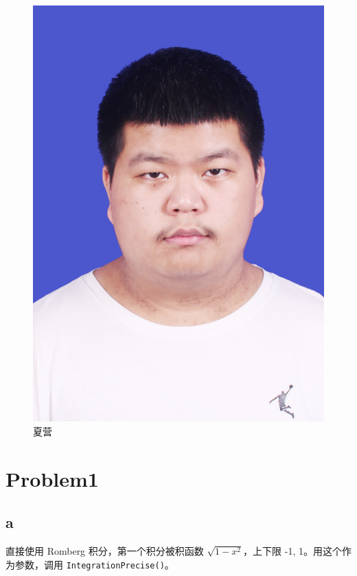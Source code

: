 \documentclass[UTF8]{ctexart}
\begin{document}
\begin{figure}[h]
        \begin{minipage}{0.32\textwidth}
            \centering
            \includegraphics[width=\linewidth]{xy}
            \caption{夏营}
            \label{fig:img3}
        \end{minipage}
    \end{figure}

    \section{Problem1}\label{sec:section1}
    \subsection{a}\label{subsec:1.1}
    直接使用 Romberg 积分，第一个积分被积函数 \(\sqrt{1 - x^2}\)，上下限 -1, 1。用这个作为参数，调用 \texttt{IntegrationPrecise()}。
\end{document}
